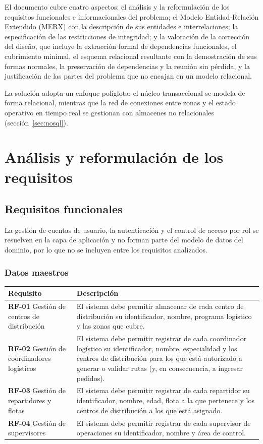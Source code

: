 \documentclass[11pt,a4paper]{article}
\begin{document}
El documento cubre cuatro aspectos: el análisis y la reformulación de los requisitos funcionales e informacionales del problema; el Modelo Entidad-Relación Extendido (MERX) con la descripción de sus entidades e interrelaciones; la especificación de las restricciones de integridad; y la valoración de la corrección del diseño, que incluye la extracción formal de dependencias funcionales, el cubrimiento minimal, el esquema relacional resultante con la demostración de sus formas normales, la preservación de dependencias y la reunión sin pérdida, y la justificación de las partes del problema que no encajan en un modelo relacional.

La solución adopta un enfoque políglota: el núcleo transaccional se modela de forma relacional, mientras que la red de conexiones entre zonas y el estado operativo en tiempo real se gestionan con almacenes no relacionales (sección~\ref{sec:nosql}).

\section{Análisis y reformulación de los requisitos}

\subsection{Requisitos funcionales}

La gestión de cuentas de usuario, la autenticación y el control de acceso por rol se resuelven en la capa de aplicación y no forman parte del modelo de datos del dominio, por lo que no se incluyen entre los requisitos analizados.

\subsubsection{Datos maestros}
\begin{longtable}{P{0.30\textwidth}P{0.64\textwidth}}
\toprule
\textbf{Requisito} & \textbf{Descripción}\\ \midrule
\endhead
\textbf{RF-01} Gestión de centros de distribución & El sistema debe permitir almacenar de cada centro de distribución su identificador, nombre, programa logístico y las zonas que cubre.\\
\textbf{RF-02} Gestión de coordinadores logísticos & El sistema debe permitir registrar de cada coordinador logístico su identificador, nombre, especialidad y los centros de distribución para los que está autorizado a generar o validar rutas (y, en consecuencia, a ingresar pedidos).\\
\textbf{RF-03} Gestión de repartidores y flotas & El sistema debe permitir registrar de cada repartidor su identificador, nombre, edad, flota a la que pertenece y los centros de distribución a los que está asignado.\\
\textbf{RF-04} Gestión de supervisores & El sistema debe permitir registrar de cada supervisor de operaciones su identificador, nombre y área de control.\\
\bottomrule
\end{longtable}
\end{document}
